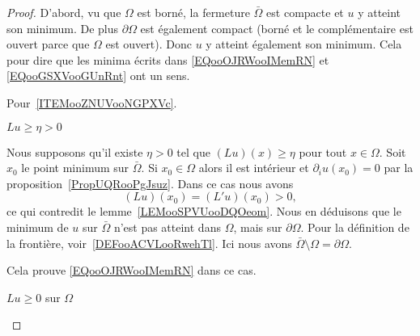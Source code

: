 \begin{proof}
    D'abord, vu que \( \Omega\) est borné, la fermeture \( \bar \Omega\) est compacte et \( u\) y atteint son minimum. De plus \( \partial \Omega\) est également compact (borné et le complémentaire est ouvert parce que \( \Omega\) est ouvert). Donc \( u\) y atteint également son minimum. Cela pour dire que les minima écrits dans \eqref{EQooOJRWooIMemRN} et \eqref{EQooGSXVooGUnRnt} ont un sens.

    Pour~\ref{ITEMooZNUVooNGPXVc}.

    \begin{subproof}
        \item[\( Lu\geq \eta>0\)]

            Nous supposons qu'il existe \( \eta>0\) tel que \( (Lu)(x)\geq \eta \) pour tout \( x\in \Omega\). Soit \( x_0\) le point minimum sur \(\bar \Omega\). Si \( x_0\in \Omega\) alors il est intérieur et \( \partial_iu(x_0)=0\) par la proposition~\ref{PropUQRooPgJsuz}. Dans ce cas nous avons
            \begin{equation}
                (Lu)(x_0)=(L'u)(x_0)> 0,
            \end{equation}
            ce qui contredit le lemme~\ref{LEMooSPVUooDQOeom}. Nous en déduisons que le minimum de \( u\) sur \( \bar \Omega\) n'est pas atteint dans \( \Omega\), mais sur \( \partial\Omega\). Pour la définition de la frontière, voir~\ref{DEFooACVLooRwehTl}. Ici nous avons \( \bar\Omega\setminus\Omega=\partial\Omega\).

            Cela prouve \eqref{EQooOJRWooIMemRN} dans ce cas.

        \item[\( Lu\geq 0\) sur \( \Omega\)]


\end{subproof}
\end{proof}
